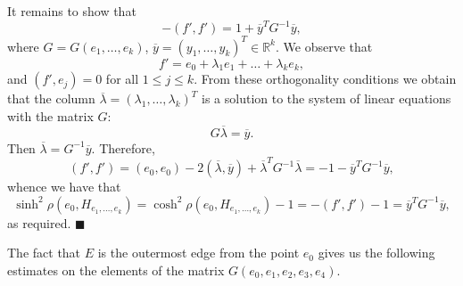 \documentclass[14pt]{article}
\newenvironment{proof}                    
       {\par\indent{\bf Proof. }} 
	        {\hfill $\scriptstyle\blacksquare$}
\begin{document}
\begin{proof}
It remains to show that
$$
-(f', f') = 1 + \overline{y}^T G^{-1} \overline{y},
$$
where
$G = G(e_1, \ldots, e_k)$, $\overline{y} = (y_1, \ldots, y_k)^T \in
\mathbb{R}^k$.
We observe that
$$
f' = e_0 + \lambda_1 e_1 + \ldots + \lambda_k e_k,
$$
and $(f', e_j) = 0$ for all $1 \le j \le k$. From these orthogonality conditions
we obtain that the column
$\overline{\lambda} = (\lambda_1, \ldots, \lambda_k)^T$ is
a solution to the system of linear equations  with the matrix $G$:
$$G \overline{\lambda} = \overline{y}.$$
Then $\overline{\lambda} = G^{-1}  \overline{y}$.
Therefore,
$$
(f', f') = (e_0, e_0) - 2(\overline{\lambda},  \overline{y})
+ \overline{\lambda}^T
G^{-1} \overline{\lambda} = -1 -  \overline{y}^T G^{-1}  \overline{y},
$$
whence we have that
$$
\sinh^2  \rho (e_0,  H_{e_1, \ldots, e_k}) = \cosh^2 \rho (e_0,
H_{e_1, \ldots, e_k}) - 1 =
-(f', f') - 1 = \overline{y}^T G^{-1}  \overline{y},
$$
as required.
\end{proof}

The fact that $E$ is the outermost edge from the point $e_0$
gives us the following estimates
on the elements of the matrix $G(e_0, e_1, e_2, e_3, e_4)$.
\end{document}
